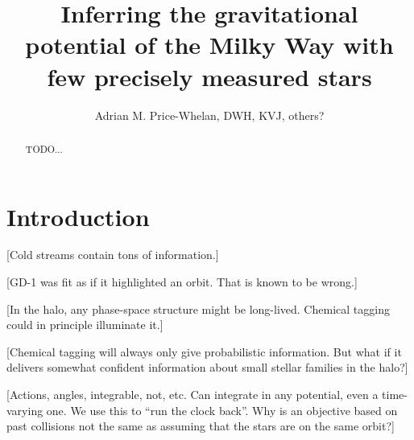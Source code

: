 \documentclass[letterpaper,12pt,preprint]{aastex}
\begin{document}
\title{Inferring the gravitational potential of the Milky Way with few precisely measured stars}
\author{Adrian M. Price-Whelan, DWH, KVJ, others?}

\begin{abstract}
TODO...
\end{abstract}


\section{Introduction}

[Cold streams contain tons of information.]

[GD-1 was fit as if it highlighted an orbit.  That is known to be
  wrong.]

[In the halo, any phase-space structure might be long-lived.  Chemical
  tagging could in principle illuminate it.]

[Chemical tagging will always only give probabilistic information.
  But what if it delivers somewhat confident information about small
  stellar families in the halo?]

[Actions, angles, integrable, not, etc.  Can integrate in any
  potential, even a time-varying one. We use this to
  ``run the clock back''.  Why is an objective based on past collisions not the
  same as assuming that the stars are on the same orbit?]
\end{document}
